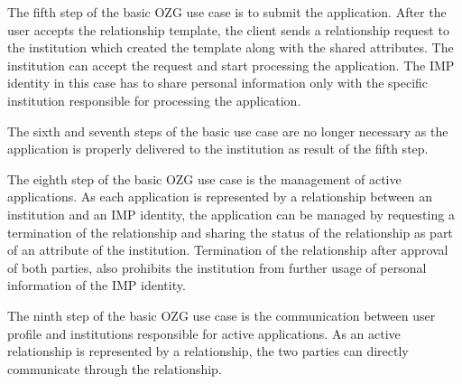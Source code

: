 The fifth step of the basic OZG use case is to submit the application. After the user accepts the relationship template, the client sends a relationship request to the institution which created the template along with the shared attributes. The institution can accept the request and start processing the application. The IMP identity in this case has to share personal information only with the specific institution responsible for processing the application.

The sixth and seventh steps of the basic use case are no longer necessary as the application is properly delivered to the institution as result of the fifth step.

The eighth step of the basic OZG use case is the management of active applications. As each application is represented by a relationship between an institution and an IMP identity, the application can be managed by requesting a termination of the relationship and sharing the status of the relationship as part of an attribute of the institution. Termination of the relationship after approval of both parties, also prohibits the institution from further usage of personal information of the IMP identity.

The ninth step of the basic OZG use case is the communication between user profile and institutions responsible for active applications. As an active relationship is represented by a relationship, the two parties can directly communicate through the relationship.
